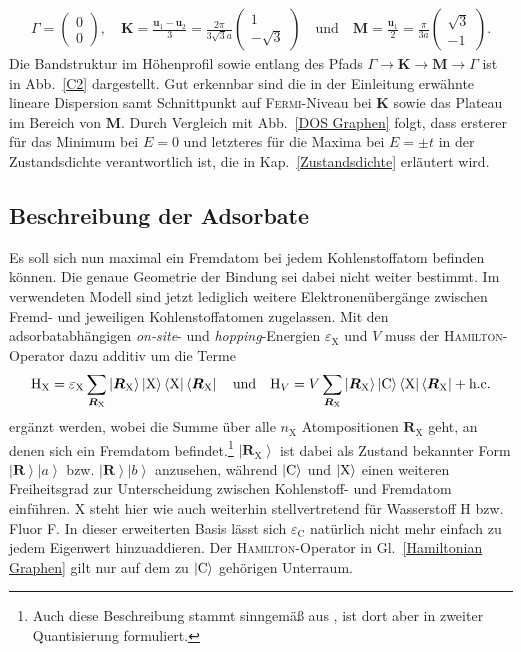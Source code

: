 \documentclass[a4paper, 10pt, twoside, openany]{book} %
\newcommand \bra[1]{\left \langle #1 \right |}
\newcommand \ket[1]{\left | #1 \right \rangle}
\def \vec {\boldsymbol}
\newcommand \op[1]{\mathrm{#1}}
\newcommand \mat[1]{\begin{pmatrix} #1 \end{pmatrix}}
\def \eC {\varepsilon_\mathrm{C}}
\def \eX {\varepsilon_\mathrm{X}}
\def \nX {n_\mathrm{X}}
\begin{document}
%
\begin{align*}
    \vec \varGamma = \mat{0 \\ 0}, \quad \vec K = \frac {\vec u_1 - \vec u_2} 3 = \frac{2 \pi}{3 \sqrt 3 a} \mat{1 \\ -\sqrt 3} \quad \text{und} \quad \vec M = \frac {\vec u_1} 2 = \frac \pi {3 a} \mat{\sqrt 3 \\ -1}.
\end{align*}
%
Die Bandstruktur im Höhenprofil sowie entlang des Pfads $\vec \varGamma \rightarrow \vec K \rightarrow \vec M \rightarrow \vec \varGamma$ ist in Abb.~\ref{C2} dargestellt. Gut erkennbar sind die in der Einleitung erwähnte lineare Dispersion samt Schnittpunkt auf \textsc{Fermi}-Niveau bei $\vec K$ sowie das Plateau im Bereich von $\vec M$. Durch Vergleich mit Abb.~\ref{DOS Graphen} folgt, dass ersterer für das Minimum bei $E = 0$ und letzteres für die Maxima bei $E = \pm t$ in der Zustandsdichte verantwortlich ist, die in Kap.~\ref{Zustandsdichte} erläutert wird.

\subsection{Beschreibung der Adsorbate}

Es soll sich nun maximal ein Fremdatom bei jedem Kohlenstoffatom befinden können. Die genaue Geometrie der Bindung sei dabei nicht weiter bestimmt. Im verwendeten Modell sind jetzt lediglich weitere Elektronenübergänge zwischen Fremd- und jeweiligen Kohlenstoffatomen zugelassen. Mit den adsorbatabhängigen \emph{on-site}- und \emph{hopping}-Energien $\eX$ und $V$ muss der \textsc{Hamilton}-Operator dazu additiv um die Terme
%
\begin{align*}
    \op H_\text{X} = \eX \sum_{\vec R_\text{X}} \ket{\vec R_\text{X}} \ket{\rm X} \bra{\rm X} \bra{\vec R_\text{X}} \quad \text{und} \quad \op H_V = V \sum_{\vec R_\text{X}} \ket{\vec R_\text{X}} \ket{\rm C} \bra{\rm X} \bra{\vec R_\text{X}} + \text{h.c.}
\end{align*}
%
ergänzt werden, wobei die Summe über alle $\nX$ Atompositionen $\vec R_\text{X}$ geht, an denen sich ein Fremdatom befindet.\footnote{Auch diese Beschreibung stammt sinngemäß aus \cite[S.~2]{Wehling2}, ist dort aber in zweiter Quantisierung formuliert.} $\ket{\vec R_\text{X}}$ ist dabei als Zustand bekannter Form $\ket{\vec R} \ket a$ bzw. $\ket{\vec R} \ket b$ anzusehen, während $\ket{\rm C}$ und $\ket{\rm X}$ einen weiteren Freiheitsgrad zur Unterscheidung zwischen Kohlenstoff- und Fremdatom einführen. X steht hier wie auch weiterhin stellvertretend für Wasserstoff H bzw. Fluor F. In dieser erweiterten Basis lässt sich $\eC$ natürlich nicht mehr einfach zu jedem Eigenwert hinzuaddieren. Der \textsc{Hamilton}-Operator in Gl.~\ref{Hamiltonian Graphen} gilt nur auf dem zu $\ket{\rm C}$ gehörigen Unterraum.
\end{document}
